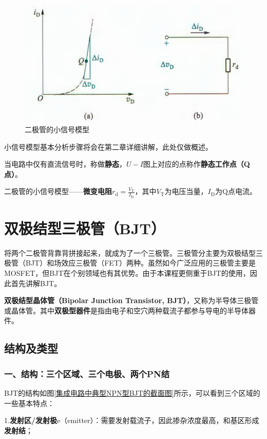 \begin{figure}[htb]
    \centering
    \includegraphics[width=0.6\linewidth]{pic/二极管的小信号模型.png}
    \caption{二极管的小信号模型\cite{康华光}\label{二极管的小信号模型}}
\end{figure}

小信号模型基本分析步骤将会在第二章详细讲解，此处仅做概述。

当电路中仅有直流信号时，称做\textbf{静态}，$U-I$图上对应的点称作\textbf{静态工作点（Q点）}。

二极管的小信号模型——\textbf{微变电阻}$r_\mathrm{d}=\frac{V_\mathrm{T}}{I_\mathrm{D}}$，其中$V_\mathrm{T}$为电压当量，$I_\mathrm{D}$为Q点电流。

\section{双极结型三极管（BJT）}
将两个二极管背靠背拼接起来，就成为了一个三极管。三极管分主要为双极结型三极管（BJT）和场效应三极管（FET）两种。虽然如今广泛应用的三极管主要是MOSFET，但BJT在个别领域也有其优势。由于本课程更侧重于BJT的使用，因此首先讲解BJT。

\textbf{双极结型晶体管（Bipolar Junction Transistor, BJT）}，又称为半导体三极管或晶体管。其中\textbf{双极型器件}是指由电子和空穴两种载流子都参与导电的半导体器件。

\subsection{结构及类型}
\subsubsection{一、结构：三个区域、三个电极、两个PN结}
BJT的结构如图\ref{集成电路中典型NPN型BJT的截面图}所示，可以看到三个区域的一些基本特点：

1.\textbf{发射区/发射极}e（emitter）：需要发射载流子，因此掺杂浓度最高，和基区形成\textbf{发射结}；

